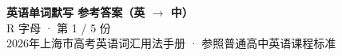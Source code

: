 \documentclass[10pt,a4paper]{article}
\begin{document}
\pagestyle{plain}

\begin{center}
{\LARGE\bfseries 英语单词默写 \quad 参考答案（英 $\to$ 中）}\\[0.22em]
{\large R 字母 · 第 1 / 5 份}\\[0.18em]
{\small 2026年上海市高考英语词汇用法手册 · 参照普通高中英语课程标准}
\end{center}

\vspace{0.2em}
\noindent{\color{rulegray}\rule{\textwidth}{0.8pt}}

\vspace{0.35em}

\vspace{0.25em}
\renewcommand{\arraystretch}{1.32}
\end{document}

